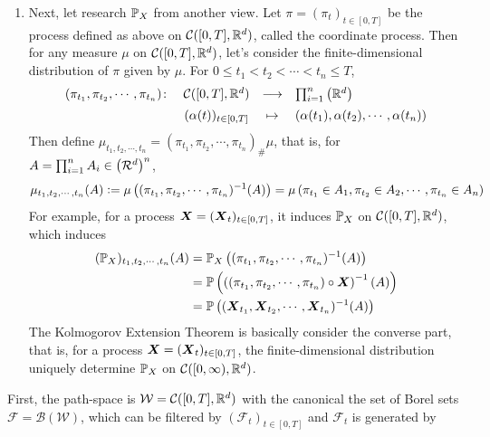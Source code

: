 \documentclass[a4paper,12pt]{article}
\begin{document}
\begin{itemize}
\begin{enumerate}[label=(\arabic*)]
    \item Next, let research $\mathbb{P}_X$ from another view.  Let $\pi = (\pi_t)_{t \in [0,T]}$ be the process defined as above on $\mathcal{C}([0,T],\mathbb{R}^d)$, called the coordinate process. Then for any measure $\mu$ on $\mathcal{C}([0,T],\mathbb{R}^d)$, let's consider the finite-dimensional distribution of $\pi$ given by $\mu$. For $0\leq t_1<t_2<\cdots < t_n \leq T$, 
    \begin{equation*}
      \begin{array}{cccl}
      \vspace{0.5em}
        (\pi_{t_1},\pi_{t_2},\cdots , \pi_{t_n}) \colon &\mathcal{C}([0,T],\R^d)& \longrightarrow & \prod_{i=1}^n\bc{\R^d}\\
        ~&(\alpha(t))_{t \in [0,T]} &\mapsto & (\alpha(t_1),\alpha(t_2),\cdots , \alpha(t_n))
      \end{array}
    \end{equation*}
    Then define $\mu_{t_1,t_2,\cdots , t_n} = (\pi_{t_1},\pi_{t_2},\cdots , \pi_{t_n})_{\#}\mu$, that is, for $A=\prod_{i=1}^nA_i \in \left(\mathcal{R}^d\right)^n$,
    \begin{equation*}
      \mu_{t_1,t_2,\cdots , t_n}(A) \vcentcolon= \mu\left((\pi_{t_1},\pi_{t_2},\cdots , \pi_{t_n})^{-1}(A)\right) = \mu\left(\pi_{t_1}\in A_1,\pi_{t_2}\in A_2,\cdots,\pi_{t_n}\in A_n\right)
    \end{equation*}
    For example, for a process $\boldsymbol{X} = (\boldsymbol{X}_t)_{t \in [0,T]}$, it induces $\mathbb{P}_X$ on $\mathcal{C}([0,T],\mathbb{R}^d)$, which induces
    \begin{equation*}
      \begin{aligned}
        (\mathbb{P}_X)_{t_1,t_2,\cdots , t_n}(A) &= \mathbb{P}_X\left((\pi_{t_1},\pi_{t_2},\cdots , \pi_{t_n})^{-1}(A)\right) \\
        &=  \mathbb{P}\left(\left((\pi_{t_1},\pi_{t_2},\cdots , \pi_{t_n})\circ\boldsymbol{X}\right)^{-1}(A)\right) \\
        &= \mathbb{P}\left((\boldsymbol{X}_{t_1},\boldsymbol{X}_{t_2},\cdots , \boldsymbol{X}_{t_n})^{-1}(A)\right)
      \end{aligned}
    \end{equation*}
    The Kolmogorov Extension Theorem is basically consider the converse part, that is, for a process $\boldsymbol{X} = (\boldsymbol{X}_t)_{t \in [0,T]}$, the finite-dimensional distribution uniquely determine $\mathbb{P}_X$ on $\mathcal{C}([0,\infty), \mathbb{R}^d)$.
  \end{enumerate}
  \begin{rmk}
    First, the path-space is $\mathcal{W} = \mathcal{C}([0,T],\mathbb{R}^d)$ with the canonical the set of Borel sets $\mathcal{F} = \mathcal{B}(\mathcal{W})$, which can be filtered by $(\mathcal{F}_t)_{t \in [0,T]}$ and $\mathcal{F}_t$ is generated by 

\end{rmk}
\end{itemize}
\end{document}
